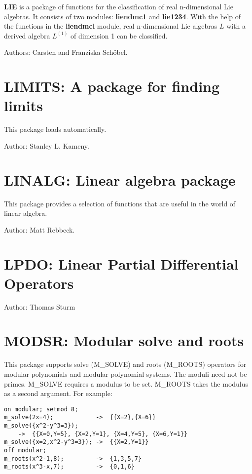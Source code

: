 {\bf LIE} is a package of functions for the classification of real
n-dimensional Lie algebras.  It consists of two modules: {\bf liendmc1}
and {\bf lie1234}.  With the help of the functions in the {\bf liendmcl}
module, real n-dimensional Lie algebras $L$ with a derived algebra
$L^{(1)}$ of dimension 1 can be classified.

Authors: Carsten and Franziska Sch\"obel.

\section{LIMITS: A package for finding limits} 


This package loads automatically.

Author: Stanley L. Kameny.



\section{LINALG: Linear algebra package} 
\label{LINALG}

This package provides a selection of functions that are useful 
in the world of linear algebra.

Author: Matt Rebbeck.


\section{LPDO: Linear Partial Differential Operators}
\label{LPDO}

Author: Thomas Sturm\

\section{MODSR: Modular solve and roots} 

This package supports solve (M\_SOLVE) and roots (M\_ROOTS) operators for
modular polynomials and modular polynomial systems.  The moduli need not
be primes. M\_SOLVE requires a modulus to be set.  M\_ROOTS takes the
modulus as a second argument. For example:

\begin{verbatim}
on modular; setmod 8;
m_solve(2x=4);            ->  {{X=2},{X=6}}
m_solve({x^2-y^3=3});
    ->  {{X=0,Y=5}, {X=2,Y=1}, {X=4,Y=5}, {X=6,Y=1}}
m_solve({x=2,x^2-y^3=3}); ->  {{X=2,Y=1}}
off modular;
m_roots(x^2-1,8);         ->  {1,3,5,7}
m_roots(x^3-x,7);         ->  {0,1,6}
\end{verbatim}

